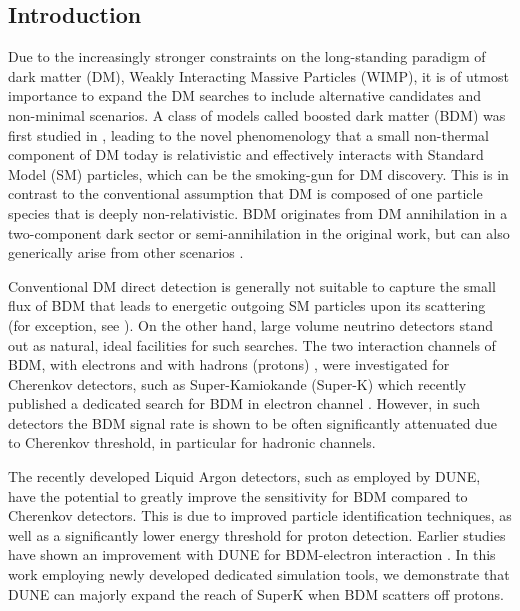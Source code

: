 \subsection{\label{sec:level1}Introduction}

Due to the increasingly stronger constraints on the long-standing paradigm of dark matter (DM), Weakly Interacting Massive Particles (WIMP), it is of utmost importance to expand the DM searches to include alternative candidates and non-minimal scenarios. A class of models called boosted dark matter (BDM) was first studied in \cite{Huang:2013xfa,Agashe:2014yua, Berger:2014sqa}, leading to the novel phenomenology that a small non-thermal component of DM today is relativistic and effectively interacts with Standard Model (SM) particles, which can be the smoking-gun for DM discovery. This is in contrast to the conventional assumption that DM is composed of one particle species that is deeply non-relativistic. BDM originates from DM annihilation in a two-component dark sector or semi-annihilation in the original work, but can also generically arise from other scenarios \cite{Carlson:1992fn, Hochberg:2014dra,Huang:2013xfa}. 

Conventional DM direct detection is generally not suitable to capture the small flux of BDM that leads to energetic outgoing SM particles upon its scattering (for exception, see \cite{Cherry:2015oca, Cui:2017ytb}). On the other hand, large volume neutrino detectors stand out as natural, ideal facilities for such searches. The two interaction channels of BDM, with electrons \cite{Agashe:2014yua} and with hadrons (protons) \cite{Berger:2014sqa}, were investigated for Cherenkov detectors, such as Super-Kamiokande (Super-K) which recently published a dedicated search for BDM in electron channel \cite{Kachulis:2017nci}. However, in such detectors the BDM signal rate is shown to be often significantly attenuated due to Cherenkov threshold, in particular for hadronic channels. 

The recently developed Liquid Argon detectors, such as employed by DUNE, have the potential to greatly improve the sensitivity for BDM compared to Cherenkov detectors. This is due to improved particle identification techniques, as well as a significantly lower energy threshold for proton detection. Earlier studies have shown an improvement with DUNE for BDM-electron interaction \cite{Necib:2016aez}. In this work employing newly developed dedicated simulation tools, we demonstrate that DUNE can majorly expand the reach of SuperK when BDM scatters off protons.

